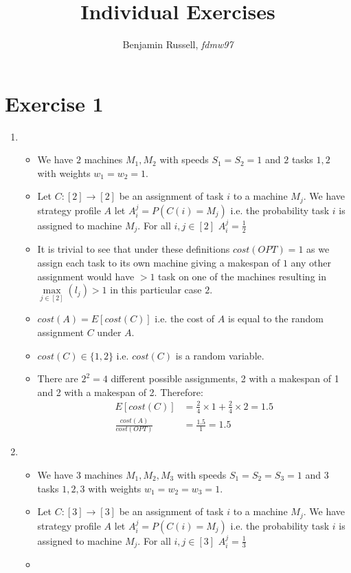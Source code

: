\documentclass[]{article}
\title{Individual Exercises}
\author{Benjamin Russell, \textit{fdmw97}}
\begin{document}
\maketitle

\section*{Exercise 1}
\begin{enumerate}
	\item ~
	\begin{itemize}
		\item
		We have $2$ machines $M_1, M_2$ with speeds $S_1=S_2=1$ and $2$ tasks $1,2$ with weights $w_1=w_2=1$.
		\item
		Let $C:[2]\rightarrow[2]$ be an assignment of task $i$ to a machine $M_j$. We have strategy profile $A$ let $A_i^j=P(C(i)=M_j)$ i.e. the probability task $i$ is assigned to machine $M_j$. For all $i,j \in[2]$ $A_i^j=\frac{1}{2}$
		\item
		It is trivial to see that under these definitions $cost(OPT)=1$ as we assign each task to its own machine giving a makespan of $1$ any other assignment would have $>1$ task on one of the machines resulting in $\max\limits_{j\in[2]}(l_j)>1$ in this particular case $2$.
		\item
		$cost(A)=E[cost(C)]$ i.e. the cost of $A$ is equal to the random assignment $C$ under $A$.
		\item
		$cost(C)\in\{1,2\}$ i.e. $cost(C)$ is a random variable.
		\item
		There are $2^2=4$ different possible assignments, 2 with a makespan of 1 and 2 with a makespan of 2. Therefore:
		\begin{align*}
						E[cost(C)]&=\frac{2}{4}\times1+\frac{2}{4}\times2=1.5 \\
						\frac{cost(A)}{cost(OPT)}&=\frac{1.5}{1}=1.5
		\end{align*}
	\end{itemize}
	\item~
	\begin{itemize}
		\item
		We have 3 machines $M_1,M_2,M_3$ with speeds $S_1=S_2=S_3=1$ and $3$ tasks $1,2,3$ with weights $w_1=w_2=w_3=1$.
		\item
		Let $C:[3]\rightarrow[3]$ be an assignment of task $i$ to a machine $M_j$. We have strategy profile $A$ let $A_i^j=P(C(i)=M_j)$ i.e. the probability task $i$ is assigned to machine $M_j$. For all $i,j\in[3]$ $A_i^j=\frac{1}{3}$
		\item

\end{itemize}
\end{enumerate}
\end{document}
